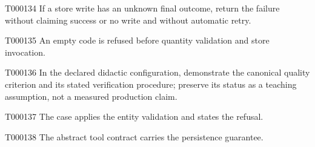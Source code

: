 \documentclass[11pt,a4paper]{article}
\begin{document}
\begin{atlasparagraph}{T000134}
If a store write has an unknown final outcome, return the failure without claiming success or no write and without automatic retry.
\end{atlasparagraph}
\begin{atlasparagraph}{T000135}
An empty code is refused before quantity validation and store invocation.
\end{atlasparagraph}
\begin{atlasparagraph}{T000136}
In the declared didactic configuration, demonstrate the canonical quality criterion and its stated verification procedure; preserve its status as a teaching assumption, not a measured production claim.
\end{atlasparagraph}
\begin{atlasparagraph}{T000137}
The case applies the entity validation and states the refusal.
\end{atlasparagraph}
\begin{atlasparagraph}{T000138}
The abstract tool contract carries the persistence guarantee.
\end{atlasparagraph}
\end{document}

